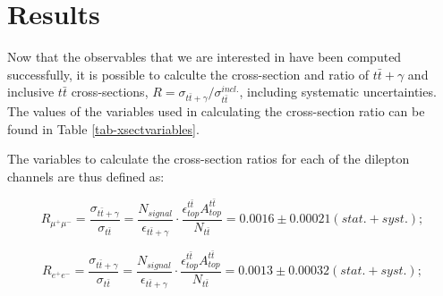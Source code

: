 \chapter{Results} \label{chap-Results}

Now that the observables that we are interested in have been computed successfully, it is possible to calculte the cross-section and ratio of $t\bar{t}+\gamma$ and inclusive $t\bar{t}$ cross-sections, $R = \sigma_{t\bar{t}+\gamma}/\sigma_{t\bar{t}}^{incl.}$, including systematic uncertainties. The values of the variables used in calculating the cross-section ratio can be found in Table \ref{tab-xsectvariables}.

\begin{table}[h!]
\begin{center}
\end{center}
\caption{Values used in calculating the cross-section ratios in the $\mu^+\mu^-$, $e^+e^-$, and $e\mu$ channels.}
\label{tab-xsectvariables}
\end{table}

The variables to calculate the cross-section ratios for each of the dilepton channels are thus defined as:

\begin{equation}
	R_{\mu^+\mu^-} = \frac{\sigma_{t\bar{t}+\gamma}}{\sigma_{t\bar{t}}} = \frac{N_{signal}}{\epsilon_{t\bar{t}+\gamma}} \cdot \frac{\epsilon^{t\bar{t}}_{top} A^{t\bar{t}}_{top}}{N_{t\bar{t}}} = 0.0016 \pm 0.00021 (stat. + syst.);
\end{equation}

\begin{equation}
	R_{e^+e^-} = \frac{\sigma_{t\bar{t}+\gamma}}{\sigma_{t\bar{t}}} = \frac{N_{signal}}{\epsilon_{t\bar{t}+\gamma}} \cdot \frac{\epsilon^{t\bar{t}}_{top} A^{t\bar{t}}_{top}}{N_{t\bar{t}}} = 0.0013 \pm 0.00032 (stat. + syst.);
\end{equation}

